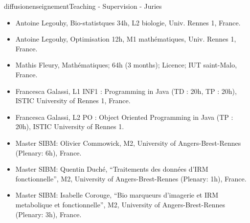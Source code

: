 \documentclass{ra2018}
\begin{document}
\begin{module}{diffusion}{enseignement}{Teaching - Supervision - Juries}
\begin{itemize}
    \item Antoine Legouhy, Bio-statistques 34h, L2 biologie, Univ. Rennes 1, France.
    \item Antoine Legouhy, Optimisation 12h, M1 mathématiques, Univ. Rennes 1, France.
    \item Mathis Fleury, Mathématiques; 64h (3 months); Licence; IUT saint-Malo, France.
    \item Francesca Galassi, L1 INF1 : Programming in Java (TD : 20h, TP : 20h), ISTIC University of Rennes 1, France.
    \item Francesca Galassi, L2 PO : Object Oriented Programming in Java (TP : 20h), ISTIC University of Rennes 1.
    \item Master SIBM: Olivier Commowick, M2, University of Angers-Brest-Rennes (Plenary: 6h), France.
    \item Master SIBM: Quentin Duché, ``Traitements des données d'IRM fonctionnelle'', M2, University of Angers-Brest-Rennes (Plenary: 1h), France.
    \item Master SIBM: Isabelle Corouge, ``Bio marqueurs d’imagerie et IRM metabolique et fonctionnelle'', M2, University of Angers-Brest-Rennes (Plenary: 3h), France.
 \end{itemize}



%


\end{module}
\end{document}
